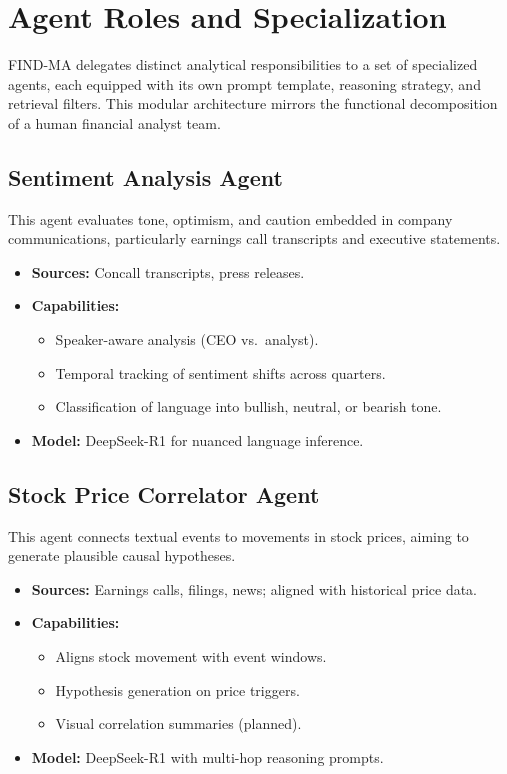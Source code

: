 \documentclass[11pt]{article}
\newcommand{\findma}{\textsc{FIND-MA}}
\begin{document}
\section{Agent Roles and Specialization}
\label{sec:agents}
\findma{} delegates distinct analytical responsibilities to a set of specialized agents, each equipped with its own prompt template, reasoning strategy, and retrieval filters. This modular architecture mirrors the functional decomposition of a human financial analyst team.

\subsection*{Sentiment Analysis Agent}
This agent evaluates tone, optimism, and caution embedded in company communications, particularly earnings call transcripts and executive statements.
\begin{itemize}
    \item \textbf{Sources:} Concall transcripts, press releases.
    \item \textbf{Capabilities:}
        \begin{itemize}
            \item Speaker-aware analysis (CEO vs.\ analyst).
            \item Temporal tracking of sentiment shifts across quarters.
            \item Classification of language into bullish, neutral, or bearish tone.
        \end{itemize}
    \item \textbf{Model:} DeepSeek-R1 for nuanced language inference.
\end{itemize}

\subsection*{Stock Price Correlator Agent}
This agent connects textual events to movements in stock prices, aiming to generate plausible causal hypotheses.
\begin{itemize}
    \item \textbf{Sources:} Earnings calls, filings, news; aligned with historical price data.
    \item \textbf{Capabilities:}
        \begin{itemize}
            \item Aligns stock movement with event windows.
            \item Hypothesis generation on price triggers.
            \item Visual correlation summaries (planned).
        \end{itemize}
    \item \textbf{Model:} DeepSeek-R1 with multi-hop reasoning prompts.
\end{itemize}
\end{document}
